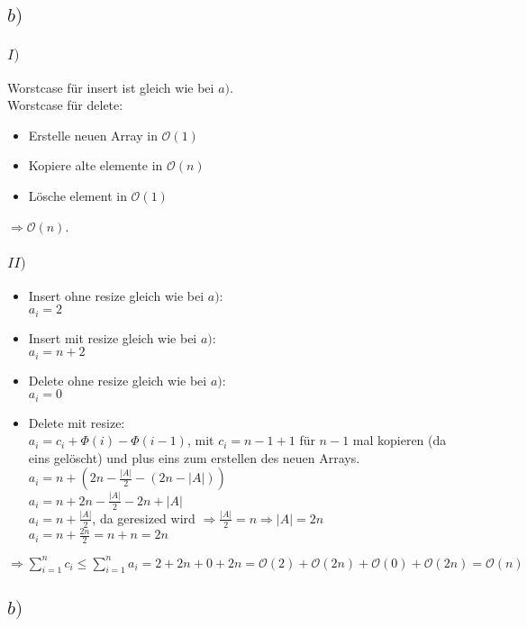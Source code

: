 \documentclass[a4paper]{scrartcl}
\begin{document}
\subsection*{$b)$}
\subsubsection*{$I)$}
Worstcase für insert ist gleich wie bei $a)$.\\
Worstcase für delete:
\begin{itemize}
	\item Erstelle neuen Array in $\mathcal{O}(1)$
	\item Kopiere alte elemente in $\mathcal{O}(n)$
	\item Lösche element in $\mathcal{O}(1)$
\end{itemize}
$\Rightarrow \mathcal{O}(n)$.

\subsubsection*{$II)$}
\begin{itemize}
	\item Insert ohne resize gleich wie bei $a)$:\\
		$a_i = 2$
	\item  Insert mit resize gleich wie bei $a)$:\\
		$a_i =n+2$	
	\item Delete ohne resize gleich wie bei $a)$:\\
		$a_i = 0$
	\item Delete mit resize:\\
		$a_i = c_i + \Phi(i) - \Phi(i-1)$, mit $c_i = n-1+1$ für $n-1$ mal kopieren (da eins gelöscht) und plus eins zum erstellen des neuen Arrays.\\		
		$a_i = n + (2n - \frac{|A|}{2} - (2n- |A|))$\\
		$a_i = n + 2n - \frac{|A|}{2} - 2n + |A|$\\
		$a_i = n + \frac{|A|}{2}$, da geresized wird $\Rightarrow \frac{|A|}{2} = n \Rightarrow |A| = 2n$\\
		$a_i = n + \frac{2n}{2} = n+n = 2n$
\end{itemize}
$\Rightarrow \sum_{i=1}^{n} c_i \le \sum_{i=1}^{n} a_i = 2+2n+0+2n = \mathcal{O}(2) + \mathcal{O}(2n) + \mathcal{O}(0) + \mathcal{O}(2n) = \mathcal{O}(n)$
\subsection*{$b)$}
\end{document}

